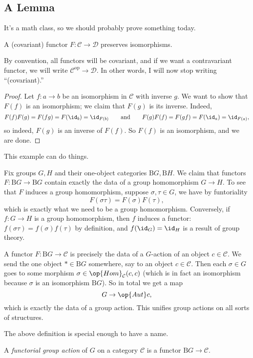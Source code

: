 \subsection{A Lemma}
It's a math class, so we should probably prove something today.
\begin{theorem}
	A (covariant) functor $F:\mathcal C\to\mathcal D$ preserves isomorphisms.
\end{theorem}
\begin{remark}
	By convention, all functors will be covariant, and if we want a contravariant functor, we will write $\mathcal C^\mathrm{op}\to\mathcal D$. In other words, I will now stop writing ``(covariant).''
\end{remark}
\begin{proof}
	Let $f:a\to b$ be an isomorphism in $\mathcal C$ with inverse $g$. We want to show that $F(f)$ is an isomorphism; we claim that $F(g)$ is its inverse. Indeed,
	\[F(f)F(g)=F(fg)=F(\id_b)=\id_{F(b)}\qquad\text{and}\qquad F(g)F(f)=F(gf)=F(\id_a)=\id_{F(a)},\]
	so indeed, $F(g)$ is an inverse of $F(f)$. So $F(f)$ is an isomorphism, and we are done.
\end{proof}
This example can do things.
\begin{example}
	Fix groups $G,H$ and their one-object categories $\mathrm BG,\mathrm BH$. We claim that functors $F:\mathrm BG\to\mathrm BG$ contain exactly the data of a group homomorphism $G\to H$. To see that $F$ induces a group homomorphism, suppose $\sigma,\tau\in G$, we have by funtoriality
	\[F(\sigma\tau)=F(\sigma)F(\tau),\]
	which is exactly what we need to be a group homomorphism. Conversely, if $f:G\to H$ is a group homomorphism, then $f$ induces a functor: $f(\sigma\tau)=f(\sigma)f(\tau)$ by definition, and $f(\id_G)=\id_H$ is a result of group theory.
\end{example}
\begin{example}
	A functor $F:\mathrm BG\to\mathcal C$ is precisely the data of a $G$-action of an object $c\in\mathcal C$. We send the one object $*\in\mathrm BG$ somewhere, say to an object $c\in\mathcal C$. Then each $\sigma\in G$ goes to some morphism $\sigma\in\op{Hom}_\mathcal C(c,c)$ (which is in fact an isomorphism because $\sigma$ is an isomorphism $\mathrm BG$). So in total we get a map
	\[G\to\op{Aut}c,\]
	which is exactly the data of a group action. This unifies group actions on all sorts of structures.
\end{example}
The above definition is special enough to have a name.
\begin{definition}
	A \textit{functorial group action} of $G$ on a category $\mathcal C$ is a functor $\mathrm BG\to\mathcal C$.
\end{definition}
